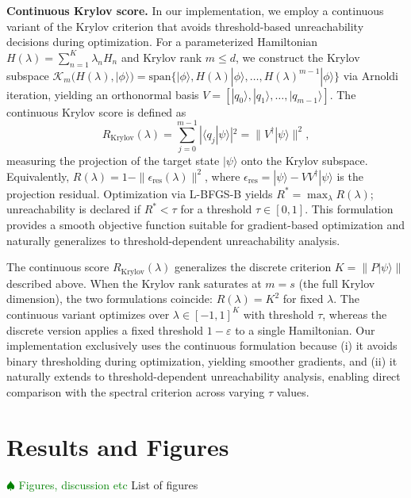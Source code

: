 \documentclass[aps,prx,reprint,superscriptaddress,footnote, twocolumn,notitlepage]{revtex4-2}
\newcommand{\tom}[1]{\textcolor{green}{#1}}
\newcommand{\todotom}[1]{\tom{$\spadesuit$ #1}}
\begin{document}
\textbf{Continuous Krylov score.} In our implementation, we employ a continuous variant of the Krylov criterion that avoids threshold-based unreachability decisions during optimization. For a parameterized Hamiltonian $H(\lambda) = \sum_{n=1}^{K} \lambda_n H_n$ and Krylov rank $m \leq d$, we construct the Krylov subspace $\mathcal{K}_m(H(\lambda), |\phi\rangle) = \text{span}\{|\phi\rangle, H(\lambda)|\phi\rangle, \ldots, H(\lambda)^{m-1}|\phi\rangle\}$ via Arnoldi iteration, yielding an orthonormal basis $V = [|q_0\rangle, |q_1\rangle, \ldots, |q_{m-1}\rangle]$. The continuous Krylov score is defined as
\begin{equation}
R_{\text{Krylov}}(\lambda) = \sum_{j=0}^{m-1} |\langle q_j | \psi \rangle|^2 = \|V^\dagger |\psi\rangle\|^2,
\end{equation}
measuring the projection of the target state $|\psi\rangle$ onto the Krylov subspace. Equivalently, $R(\lambda) = 1 - \|\epsilon_{\text{res}}(\lambda)\|^2$, where $\epsilon_{\text{res}} = |\psi\rangle - VV^\dagger |\psi\rangle$ is the projection residual. Optimization via L-BFGS-B yields $R^* = \max_{\lambda} R(\lambda)$; unreachability is declared if $R^* < \tau$ for a threshold $\tau \in [0,1]$. This formulation provides a smooth objective function suitable for gradient-based optimization and naturally generalizes to threshold-dependent unreachability analysis.

The continuous score $R_{\text{Krylov}}(\lambda)$ generalizes the discrete criterion $K = \|P|\psi\rangle\|$ described above. When the Krylov rank saturates at $m = s$ (the full Krylov dimension), the two formulations coincide: $R(\lambda) = K^2$ for fixed $\lambda$. The continuous variant optimizes over $\lambda \in [-1,1]^K$ with threshold $\tau$, whereas the discrete version applies a fixed threshold $1-\varepsilon$ to a single Hamiltonian. Our implementation exclusively uses the continuous formulation because (i) it avoids binary thresholding during optimization, yielding smoother gradients, and (ii) it naturally extends to threshold-dependent unreachability analysis, enabling direct comparison with the spectral criterion across varying $\tau$ values.

\section{{Results and Figures}}
\todotom{Figures, discussion etc}
List of figures
\end{document}
